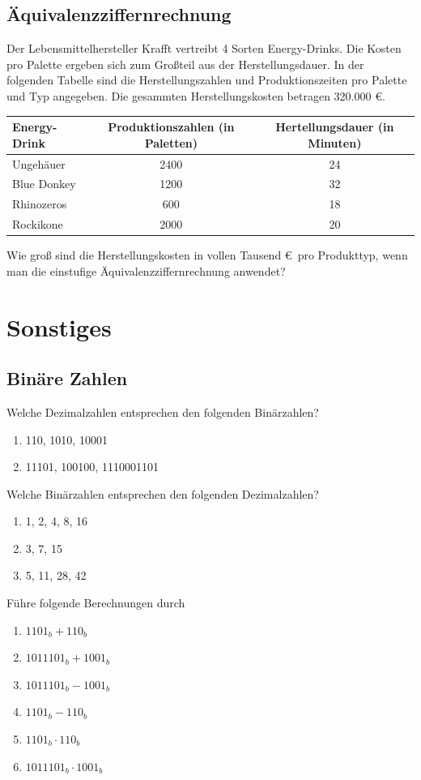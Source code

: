 \documentclass[11pt, a4paper]{article}
\begin{document}
\subsection{Äquivalenzziffernrechnung}
Der Lebensmittelhersteller Krafft vertreibt 4 Sorten Energy-Drinks. Die Kosten pro Palette ergeben sich zum Großteil aus der Herstellungsdauer. In der folgenden Tabelle sind die Herstellungszahlen und Produktionszeiten pro Palette und Typ angegeben. Die gesammten Herstellungskosten betragen 320.000 \euro.

\begin{tabular}{lcc}
	Energy-Drink & Produktionszahlen (in Paletten) & Hertellungsdauer (in Minuten) \\ \hline
	Ungehäuer & 2400 & 24 \\
	Blue Donkey & 1200 & 32 \\
	Rhinozeros & 600 & 18 \\
	Rockikone & 2000 & 20
\end{tabular}

\vspace{\baselineskip}
Wie groß sind die Herstellungskosten in vollen Tausend \euro \ pro Produkttyp, wenn man die einstufige Äquivalenzziffernrechnung anwendet?

\newpage
\section{Sonstiges}
\subsection{Binäre Zahlen}
Welche Dezimalzahlen entsprechen den folgenden Binärzahlen?
\begin{enumerate}
	\item 110, 1010, 10001
	\item 11101, 100100, 1110001101
\end{enumerate}
Welche Binärzahlen entsprechen den folgenden Dezimalzahlen?
\begin{enumerate}
	\item 1, 2, 4, 8, 16
	\item 3, 7, 15
	\item 5, 11, 28, 42
\end{enumerate}
Führe folgende Berechnungen durch
\begin{enumerate}
	\item $1101_b + 110_b$
	\item $1011101_b + 1001_b$
	\item $1011101_b - 1001_b$
	\item $1101_b - 110_b$
	\item $1101_b \cdot 110_b$
	\item $1011101_b \cdot 1001_b$
\end{enumerate}
\end{document}
